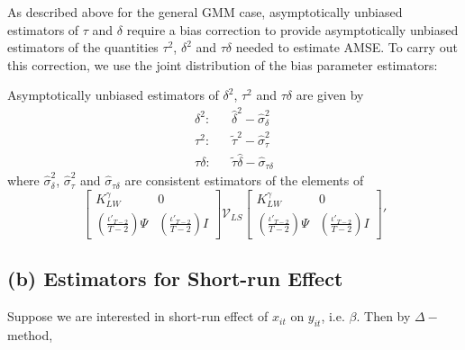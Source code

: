 As described above for the general GMM case, asymptotically unbiased estimators of $\tau$ and $\delta$ require a bias correction to provide asymptotically unbiased estimators of the quantities $\tau^2$, $\delta^2$ and $\tau\delta$ needed to estimate AMSE. 
To carry out this correction, we use the joint distribution of the bias parameter estimators:
\begin{cor}
Asymptotically unbiased estimators of $\delta^2$, $\tau^2$ and $\tau\delta$ are given by
\begin{eqnarray}
	\delta^2 \colon &&\widehat{\delta}^2 - \widehat{\sigma}_\delta^2\\
	\tau^2 \colon &&\widetilde{\tau}^2 - \widehat{\sigma}_\tau^2\\
	\tau \delta \colon && \widetilde{\tau}\widehat{\delta} - \widehat{\sigma}_{\tau\delta}
\end{eqnarray}
where $\widehat{\sigma}_\delta^2$, $\widehat{\sigma}_\tau^2$ and $\widehat{\sigma}_{\tau\delta}$ are consistent estimators of the elements of
$$\left[\begin{array}{cc} K_{LW}^\gamma&0 \\ \left(\frac{\iota'_{T-2}}{T-2} \right) \Psi&  \left(\frac{\iota'_{T-2}}{T-2} \right) I\end{array} \right] \mathcal{V}_{LS}  \left[\begin{array}{cc} K_{LW}^\gamma&0 \\ \left(\frac{\iota'_{T-2}}{T-2} \right) \Psi&  \left(\frac{\iota'_{T-2}}{T-2} \right) I\end{array} \right]'$$
\end{cor}




\subsection*{(b) Estimators for Short-run Effect}


Suppose we are interested in short-run effect of $x_{it}$ on $y_{it}$, i.e. $\beta$.  Then  by $\Delta-$method,

